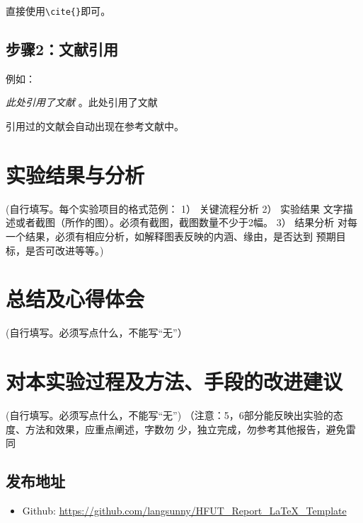 \documentclass[12pt,hyperref,a4paper,twoside,UTF8]{ctexart}
\begin{document}
直接使用\verb|\cite{}|即可\cite{DBLP:conf/nips/VaswaniSPUJGKP17}。
\subsection{步骤2：文献引用}
例如：


   \textit{ 此处引用了文献}
   \cite{DBLP:conf/nips/VaswaniSPUJGKP17}。此处引用了文献\cite{DBLP:conf/nips/VaswaniSPUJGKP17}


引用过的文献会自动出现在参考文献中。

\section{实验结果与分析}
 (自行填写。每个实验项目的格式范例：
1） 关键流程分析
2） 实验结果
文字描述或者截图（所作的图）。必须有截图，截图数量不少于2幅。
3） 结果分析
对每一个结果，必须有相应分析，如解释图表反映的内涵、缘由，是否达到
预期目标，是否可改进等等。)
\section{总结及心得体会}

 (自行填写。必须写点什么，不能写“无”）
\section{对本实验过程及方法、手段的改进建议}


 (自行填写。必须写点什么，不能写“无”)
（注意：5，6部分能反映出实验的态度、方法和效果，应重点阐述，字数勿
少，独立完成，勿参考其他报告，避免雷同

\subsection{发布地址}
\begin{itemize}
    \item Github: \url{https://github.com/langsunny/HFUT_Report_LaTeX_Template}
\end{itemize}



\end{document}

